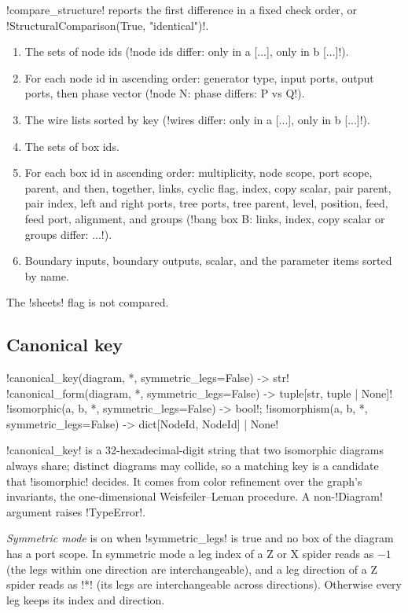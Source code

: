 \py!compare_structure! reports the first difference in a fixed check order, or \py!StructuralComparison(True, "identical")!.
\begin{enumerate}
\item The sets of node ids (\code!node ids differ: only in a [...], only in b [...]!).
\item For each node id in ascending order: generator type, input ports, output ports, then phase vector (\code!node N: phase differs: P vs Q!).
\item The wire lists sorted by key (\code!wires differ: only in a [...], only in b [...]!).
\item The sets of box ids.
\item For each box id in ascending order: multiplicity, node scope, port scope, parent, and then, together, links, cyclic flag, index, copy scalar, pair parent, pair index, left and right ports, tree ports, tree parent, level, position, feed, feed port, alignment, and groups (\code!bang box B: links, index, copy scalar or groups differ: ...!).
\item Boundary inputs, boundary outputs, scalar, and the parameter items sorted by name.
\end{enumerate}
The \py!sheets! flag is not compared.

\subsection{Canonical key}

\begin{signature}
\py!canonical_key(diagram, *, symmetric_legs=False) -> str!\\
\py!canonical_form(diagram, *, symmetric_legs=False) -> tuple[str, tuple | None]!\\
\py!isomorphic(a, b, *, symmetric_legs=False) -> bool!; \py!isomorphism(a, b, *, symmetric_legs=False) -> dict[NodeId, NodeId] | None!
\end{signature}

\py!canonical_key! is a 32-hexadecimal-digit string that two isomorphic diagrams always share; distinct diagrams may collide, so a matching key is a candidate that \py!isomorphic! decides. It comes from color refinement over the graph's invariants, the one-dimensional Weisfeiler--Leman procedure. A non-\py!Diagram! argument raises \py!TypeError!.

\begin{definition}\label{def:diagrams-leg-symmetry}
\emph{Symmetric mode} is on when \py!symmetric_legs! is true and no box of the diagram has a port scope. In symmetric mode a leg index of a Z or X spider reads as $-1$ (the legs within one direction are interchangeable), and a leg direction of a Z spider reads as \code!*! (its legs are interchangeable across directions). Otherwise every leg keeps its index and direction.
\end{definition}

